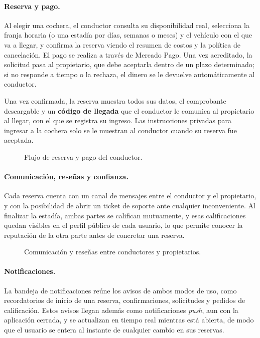 \paragraph{Reserva y pago.} Al elegir una cochera, el conductor consulta su disponibilidad real, selecciona la franja horaria (o una estadía por días, semanas o meses) y el vehículo con el que va a llegar, y confirma la reserva viendo el resumen de costos y la política de cancelación. El pago se realiza a través de Mercado Pago. Una vez acreditado, la solicitud pasa al propietario, que debe aceptarla dentro de un plazo determinado; si no responde a tiempo o la rechaza, el dinero se le devuelve automáticamente al conductor.

Una vez confirmada, la reserva muestra todos sus datos, el comprobante descargable y un \textbf{código de llegada} que el conductor le comunica al propietario al llegar, con el que se registra su ingreso. Las instrucciones privadas para ingresar a la cochera solo se le muestran al conductor cuando su reserva fue aceptada.

\begin{figure}[H]
\centering
{}\hfill
{}\hfill
{}
\caption{Flujo de reserva y pago del conductor.}
\label{fig:app_reserva}
\end{figure}

\paragraph{Comunicación, reseñas y confianza.} Cada reserva cuenta con un canal de mensajes entre el conductor y el propietario, y con la posibilidad de abrir un ticket de soporte ante cualquier inconveniente. Al finalizar la estadía, ambas partes se califican mutuamente, y esas calificaciones quedan visibles en el perfil público de cada usuario, lo que permite conocer la reputación de la otra parte antes de concretar una reserva.

\begin{figure}[H]
\centering
{}\hfill
{}\hfill
{}
\caption{Comunicación y reseñas entre conductores y propietarios.}
\label{fig:app_confianza}
\end{figure}

\paragraph{Notificaciones.} La bandeja de notificaciones reúne los avisos de ambos modos de uso, como recordatorios de inicio de una reserva, confirmaciones, solicitudes y pedidos de calificación. Estos avisos llegan además como notificaciones \textit{push}, aun con la aplicación cerrada, y se actualizan en tiempo real mientras está abierta, de modo que el usuario se entera al instante de cualquier cambio en sus reservas.

